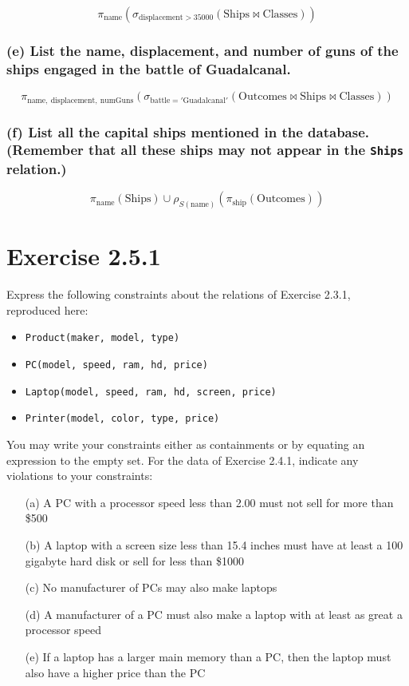 \documentclass{cshwk}
\begin{document}
\[
    \pi_{\text{name}} ( \sigma_{\text{displacement} > 35000} (\text{Ships} \bowtie \text{Classes}) )
\]

\subsubsection*{(e) List the name, displacement, and number of guns of the ships engaged in the battle of Guadalcanal.}

\[
    \pi_{\text{name},\ \text{displacement},\ \text{numGuns}} (
    \sigma_{\text{battle} = '\text{Guadalcanal}'} (\text{Outcomes} \bowtie \text{Ships} \bowtie \text{Classes})
    )
\]

\subsubsection*{(f) List all the capital ships mentioned in the database. (Remember that all these ships may not appear in the \texttt{Ships} relation.)}

\[
    \pi_{\text{name}} ( \text{Ships} )
    \cup
    \rho_{S(\text{name})}(\pi_{\text{ship}} ( \text{Outcomes} ))
\]

\section{Exercise 2.5.1}

Express the following constraints about the relations of Exercise 2.3.1, reproduced here:

\begin{itemize}
    \item \texttt{Product(maker, model, type)}
    \item \texttt{PC(model, speed, ram, hd, price)}
    \item \texttt{Laptop(model, speed, ram, hd, screen, price)}
    \item \texttt{Printer(model, color, type, price)}
\end{itemize}


You may write your constraints either as containments or by equating an expression to the empty set. For the data of Exercise 2.4.1, indicate any violations to your constraints:

\begin{itemize}
    \item[(a)] A PC with a processor speed less than 2.00 must not sell for more than \$500

    \item[(b)] A laptop with a screen size less than 15.4 inches must have at least a 100 gigabyte hard disk or sell for less than \$1000

    \item[(c)] No manufacturer of PCs may also make laptops

    \item[(d)] A manufacturer of a PC must also make a laptop with at least as great a processor speed

    \item[(e)] If a laptop has a larger main memory than a PC, then the laptop must also have a higher price than the PC
\end{itemize}
\end{document}
